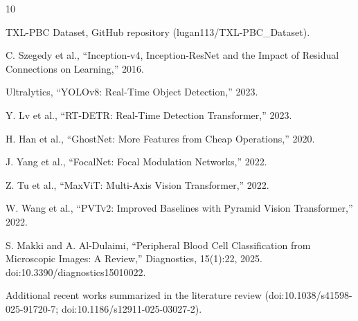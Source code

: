 \documentclass[conference]{IEEEtran}
\begin{document}
\begin{thebibliography}{10}

TXL-PBC Dataset, GitHub repository (lugan113/TXL-PBC\_Dataset).

C. Szegedy et al., ``Inception-v4, Inception-ResNet and the Impact of Residual Connections on Learning,'' 2016.

Ultralytics, ``YOLOv8: Real-Time Object Detection,'' 2023.

Y. Lv et al., ``RT-DETR: Real-Time Detection Transformer,'' 2023.

H. Han et al., ``GhostNet: More Features from Cheap Operations,'' 2020.

J. Yang et al., ``FocalNet: Focal Modulation Networks,'' 2022.

Z. Tu et al., ``MaxViT: Multi-Axis Vision Transformer,'' 2022.

W. Wang et al., ``PVTv2: Improved Baselines with Pyramid Vision Transformer,'' 2022.

S. Makki and A. Al-Dulaimi, ``Peripheral Blood Cell Classification from Microscopic Images: A Review,'' Diagnostics, 15(1):22, 2025. doi:10.3390/diagnostics15010022.

Additional recent works summarized in the literature review (doi:10.1038/s41598-025-91720-7; doi:10.1186/s12911-025-03027-2).

\end{thebibliography}
\end{document}

